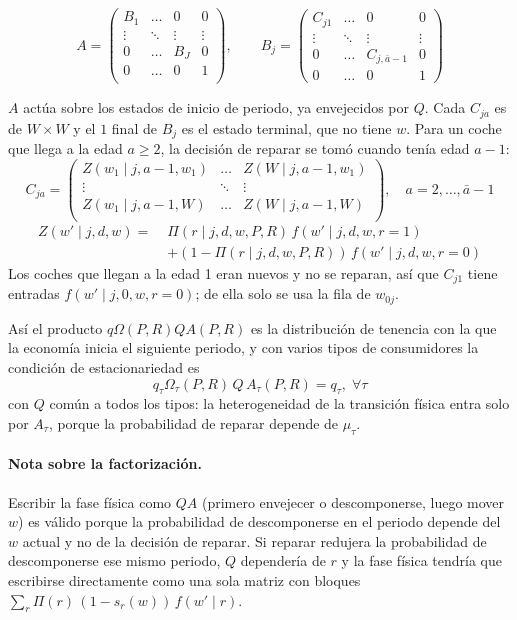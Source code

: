 \documentclass{article}
\begin{document}
$$A=
\begin{pmatrix}
    B_1 & \dots & 0 & 0 \\
    \vdots & \ddots& \vdots & \vdots \\
    0 & \dots & B_J & 0 \\
    0 & \dots & 0 & 1 \\
\end{pmatrix},
\qquad
B_j=
\begin{pmatrix}
    C_{j1} & \dots & 0 & 0 \\
    \vdots & \ddots & \vdots & \vdots \\
    0 & \dots & C_{j,\bar{a}-1} & 0\\
    0 & \dots & 0 & 1
\end{pmatrix}
$$

$A$ actúa sobre los estados de inicio de periodo, ya envejecidos por $Q$. Cada $C_{ja}$ es de $W\times W$ y el $1$ final de $B_j$ es el estado terminal, que no tiene $w$. Para un coche que llega a la edad $a\ge 2$, la decisión de reparar se tomó cuando tenía edad $a-1$:
$$
C_{ja}=\begin{pmatrix}
   Z(w_1\mid j,a-1,w_1) & \dots & Z(W\mid j,a-1,w_1)\\
   \vdots & \ddots & \vdots\\
   Z(w_1\mid j,a-1,W) & \dots & Z(W\mid j,a-1,W)\\
\end{pmatrix},\quad a=2,\dots,\bar{a}-1
$$
$$\begin{aligned}
    Z(w'\mid j,d,w)=\;&\Pi(r\mid j,d,w, P, R)\,f(w'\mid j,d,w,r=1)\\
    &+(1-\Pi(r\mid j,d,w, P, R))\,f(w'\mid j,d,w,r=0)
\end{aligned}$$
Los coches que llegan a la edad 1 eran nuevos y no se reparan, así que $C_{j1}$ tiene entradas $f(w'\mid j,0,w,r=0)$; de ella solo se usa la fila de $w_{0j}$.

Así el producto $q\Omega(P,R)QA(P,R)$ es la distribución de tenencia con la que la economía inicia el siguiente periodo, y con varios tipos de consumidores la condición de estacionariedad es
$$q_\tau \Omega_\tau(P,R)\,Q\,A_\tau(P,R)=q_\tau,\; \forall \tau$$
con $Q$ común a todos los tipos: la heterogeneidad de la transición física entra solo por $A_\tau$, porque la probabilidad de reparar depende de $\mu_\tau$.

\paragraph{Nota sobre la factorización.} Escribir la fase física como $QA$ (primero envejecer o descomponerse, luego mover $w$) es válido porque la probabilidad de descomponerse en el periodo depende del $w$ actual y no de la decisión de reparar. Si reparar redujera la probabilidad de descomponerse ese mismo periodo, $Q$ dependería de $r$ y la fase física tendría que escribirse directamente como una sola matriz con bloques $\sum_r \Pi(r)\,(1-s_r(w))\,f(w'\mid r)$.
\end{document}
